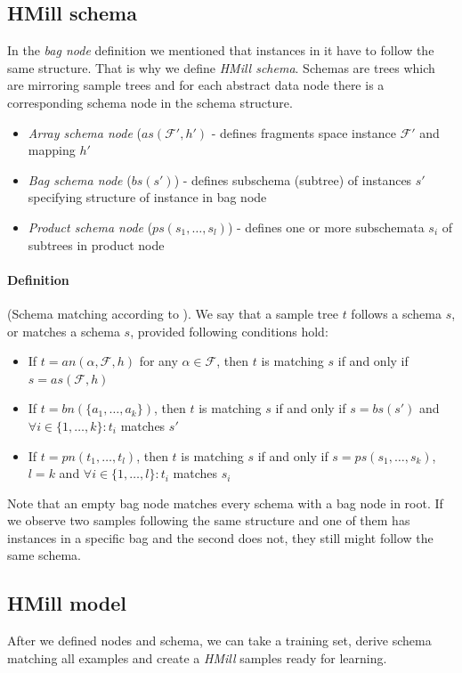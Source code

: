 \subsection{HMill schema}
In the \emph{bag node} definition we mentioned that instances in it have to follow the same structure. That is why we define \emph{HMill schema}. Schemas are trees which are mirroring sample trees and for each abstract data node there is a corresponding schema node in the schema structure. 
\begin{itemize}
    \itemsep0em 
    \item \emph{Array schema node} ($as(\mathcal{F'},h')$ - defines fragments space instance $\mathcal{F'}$ and mapping $h'$
    \item \emph{Bag schema node} ($bs(s')$) - defines subschema (subtree) of instances $s'$ specifying structure of instance in bag node
    \item \emph{Product schema node} ($ps(s_1,\dots,s_{l})$) - defines one or more subschemata $s_i$ of subtrees in product node
\end{itemize}

\paragraph{Definition} (Schema matching according to \cite{Mandlik2020}). We say that a sample tree $t$ follows a schema $s$, or matches a schema $s$, provided following conditions hold:
\begin{itemize}
    \itemsep0em 
    \item If $t=an(\alpha,\mathcal{F},h)$ for any $\alpha\in\mathcal{F}$, then $t$ is matching $s$ if and only if $s=as(\mathcal{F},h)$
    \item If $t=bn(\{a_1,\dots,a_k\})$, then $t$ is matching $s$ if and only if $s=bs(s')$ and $\forall i\in\{1,\dots,k\}:t_i$ matches $s'$
    \item If $t=pn(t_1,\dots,t_l)$, then $t$ is matching $s$ if and only if $s=ps(s_1,\dots,s_k)$,$l=k$ and $\forall i\in\{1,\dots,l\}:t_i$ matches $s_i$
\end{itemize}

Note that an empty bag node matches every schema with a bag node in root. If we observe two samples following the same structure and one of them has instances in a specific bag and the second does not, they still might follow the same schema.

\subsection{HMill model}
After we defined nodes and schema, we can take a training set, derive schema matching all examples and create a \emph{HMill} samples ready for learning. 

